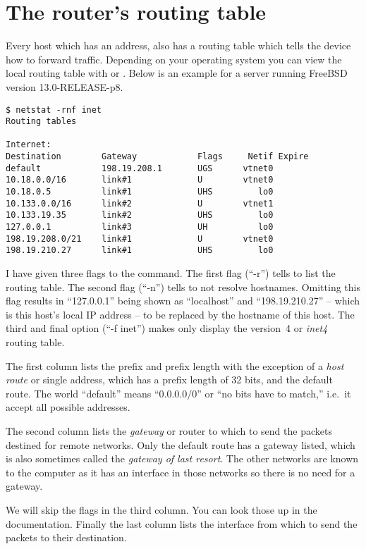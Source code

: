 \section{The router's routing table}

Every host which has an  address, also has a routing table which tells the device how to forward traffic.
Depending on your operating system you can view the local routing table with  or .
Below is an example for a server running FreeBSD version 13.0-RELEASE-p8.
\begin{verbatim}
$ netstat -rnf inet
Routing tables

Internet:
Destination        Gateway            Flags     Netif Expire
default            198.19.208.1       UGS      vtnet0
10.18.0.0/16       link#1             U        vtnet0
10.18.0.5          link#1             UHS         lo0
10.133.0.0/16      link#2             U        vtnet1
10.133.19.35       link#2             UHS         lo0
127.0.0.1          link#3             UH          lo0
198.19.208.0/21    link#1             U        vtnet0
198.19.210.27      link#1             UHS         lo0
\end{verbatim}
I have given three flags to the command.
The first flag (``-r'') tells  to list the routing table.
The second flag (``-n'') tells  to not resolve hostnames.
Omitting this flag results in ``127.0.0.1'' being shown as ``localhost'' and ``198.19.210.27'' -- which is this host's local IP address -- to be replaced by the hostname of this host.
The third and final option (``-f inet'') makes  only display the  version~4 or \emph{inet4} routing table.

The first column lists the prefix and prefix length with the exception of a \emph{host route} or single  address, which has a prefix length of 32 bits, and the default route.
The world ``default'' means ``0.0.0.0/0'' or ``no bits have to match,'' i.e.~it accept all possible  addresses.

The second column lists the \emph{gateway} or router to which to send the packets destined for remote networks.
Only the default route has a gateway listed, which is also sometimes called the \emph{gateway of last resort}.
The other networks are known to the computer as it has an interface in those networks so there is no need for a gateway.

We will skip the flags in the third column.
You can look those up in the documentation.
Finally the last column lists the interface from which to send the packets to their destination.

